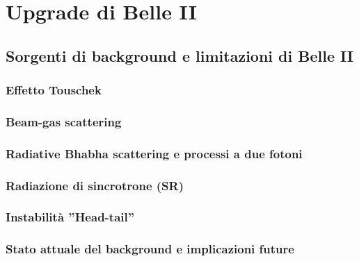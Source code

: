 \documentclass[10pt,a4paper,twoside]{report}
\begin{document}



\chapter{Upgrade di Belle II}

\section{Sorgenti di background e limitazioni di Belle II}

\subsection{Effetto Touschek}

\subsection{Beam-gas scattering}

\subsection{Radiative Bhabha scattering e processi a due fotoni}

\subsection{Radiazione di sincrotrone (SR)}

\subsection{Instabilità ''Head-tail''}

\subsection{Stato attuale del background e implicazioni future}
\end{document}
